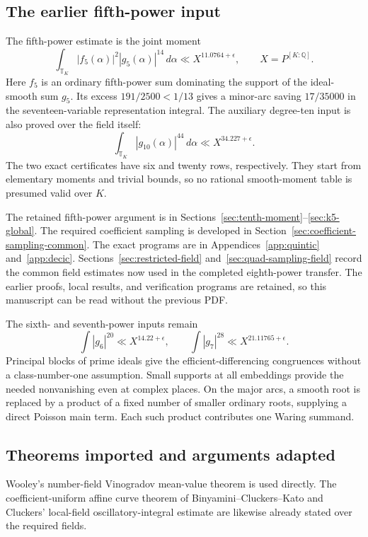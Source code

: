 \documentclass[11pt,reqno]{amsart}
\numberwithin{equation}{section}
\theoremstyle{definition}
\begin{document}
\subsection{The earlier fifth-power input}


The fifth-power estimate is the joint moment
\begin{equation}\label{eq:quintic-overview}
 \int_{\mathbb T_K}|f_5(\alpha)|^2|g_5(\alpha)|^{14}\,d\alpha
          \ll X^{11.0764+\epsilon},
 \qquad X=P^{[K:\mathbb Q]}.
\end{equation}
Here $f_5$ is an ordinary fifth-power sum dominating the support of the
ideal-smooth sum $g_5$.  Its excess $191/2500<1/13$ gives a minor-arc
saving $17/35000$ in the seventeen-variable representation integral.
The auxiliary degree-ten input is also proved over the field itself:
\[
 \int_{\mathbb T_K}|g_{10}(\alpha)|^{44}\,d\alpha
                         \ll X^{34.227+\epsilon}.
\]
The two exact certificates have six and twenty rows, respectively.
They start from elementary moments and trivial bounds, so no rational
smooth-moment table is presumed valid over $K$.

The retained fifth-power argument is in Sections~\ref{sec:tenth-moment}--\ref{sec:k5-global}.
The required coefficient sampling is developed in
Section~\ref{sec:coefficient-sampling-common}.
The exact programs are in Appendices~\ref{app:quintic} and~\ref{app:decic}.
Sections~\ref{sec:restricted-field} and~\ref{sec:quad-sampling-field}
record the common field estimates now used in the completed eighth-power transfer.
The earlier proofs, local results, and verification programs are retained,
so this manuscript can be read without the previous PDF.

The sixth- and seventh-power inputs remain
\[
 \int|g_6|^{20}\ll X^{14.22+\epsilon},\qquad
 \int|g_7|^{28}\ll X^{21.11765+\epsilon}.
\]
Principal blocks of prime ideals give the efficient-differencing congruences
without a class-number-one assumption.  Small supports at all embeddings
provide the needed nonvanishing even at complex places.  On the major arcs,
a smooth root is replaced by a product of a fixed number of smaller ordinary
roots, supplying a direct Poisson main term.  Each such product contributes
one Waring summand.

\subsection{Theorems imported and arguments adapted}

Wooley's number-field Vinogradov mean-value theorem
\cite[Theorem~15.1 and Corollary~15.3]{Wooley2019} is used directly.
The coefficient-uniform affine curve theorem of
Binyamini--Cluckers--Kato \cite[Corollary~12]{BCK2025} and Cluckers'
local-field oscillatory-integral estimate \cite[Proposition~3.3]{Cluckers2011}
are likewise already stated over the required fields.
\end{document}
